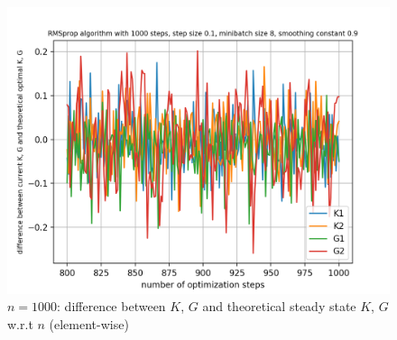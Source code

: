 \documentclass{article}
\begin{document}
\begin{figure}[h!]
\begin{minipage}[t]{.28\paperwidth}
		\includegraphics[width=1.0\textwidth]{Figures/d_last_200_n1000_sep.png}
		\caption{$n = 1000$: difference between $K$, $G$ and theoretical steady state $K$, $G$ w.r.t $n$ (element-wise)\label{fig:d_last200_n1000_sep}}
	\end{minipage}
\end{figure}


\end{document}
